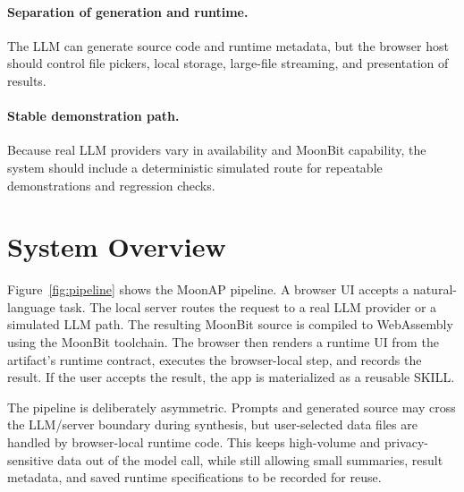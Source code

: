\documentclass[11pt]{article}
\newcommand{\moonap}{MoonAP}
\newcommand{\skill}{SKILL}
\newcommand{\wasm}{WebAssembly}
\begin{document}
\paragraph{Separation of generation and runtime.}
The LLM can generate source code and runtime metadata, but the browser host should control file pickers, local storage, large-file streaming, and presentation of results.

\paragraph{Stable demonstration path.}
Because real LLM providers vary in availability and MoonBit capability, the system should include a deterministic simulated route for repeatable demonstrations and regression checks.

\section{System Overview}

Figure~\ref{fig:pipeline} shows the \moonap{} pipeline. A browser UI accepts a natural-language task. The local server routes the request to a real LLM provider or a simulated LLM path. The resulting MoonBit source is compiled to \wasm{} using the MoonBit toolchain. The browser then renders a runtime UI from the artifact's runtime contract, executes the browser-local step, and records the result. If the user accepts the result, the app is materialized as a reusable \skill{}.

The pipeline is deliberately asymmetric. Prompts and generated source may cross the LLM/server boundary during synthesis, but user-selected data files are handled by browser-local runtime code. This keeps high-volume and privacy-sensitive data out of the model call, while still allowing small summaries, result metadata, and saved runtime specifications to be recorded for reuse.
\end{document}
